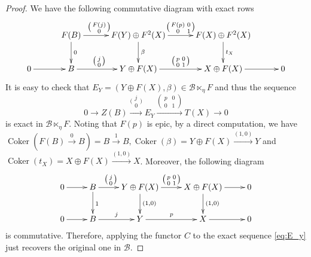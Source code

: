 \documentclass[11pt,reqno]{amsart}
\numberwithin{equation}{section}
\newcommand{\cB}{\mathcal B}
\newcommand{\Coker}{\operatorname{Coker}}
\begin{document}
\begin{proof}
We have the following commutative diagram with exact rows
\[
\xymatrix@C=2.5pc{ & F(B) \ar[r]^{\big(\begin{smallmatrix}F(j)\\ 0\end{smallmatrix}\big)\ \ \ \ } \ar[d]^{0} & F(Y)\oplus F^2(X)
\ar[r]^{\big(\begin{smallmatrix}F(p)&0\\ 0&1\end{smallmatrix}\big)} \ar[d]^{\beta}
& F(X)\oplus F^2(X) \ar[d]^{t_{X}}  \\
0\ar[r] & B\ar[r]^{\big(\begin{smallmatrix}j\\ 0\end{smallmatrix}\big)\ \ \ \ } & Y\oplus F(X)
\ar[r]^{\big(\begin{smallmatrix}p&0\\ 0&1\end{smallmatrix}\big)}& X\oplus F(X)\ar[r]&0}
\]
It is easy to check that $E_Y=(Y\oplus F(X), \beta)\in \cB\ltimes_\eta F$ and thus the sequence
\begin{equation}\label{eq:E_y}
0\rightarrow Z(B)\xrightarrow{\big(\begin{smallmatrix}j\\ 0\end{smallmatrix}\big)} E_Y\xrightarrow{\left(\begin{smallmatrix}p & 0\\ 0 & 1\end{smallmatrix}\right)} T(X)\rightarrow 0
\end{equation}
is exact in $\cB\ltimes_\eta F$. Noting that $F(p)$ is epic, by a direct computation, we have $\Coker(F(B)\xrightarrow{0} B)=B\xrightarrow{1}B, \Coker(\beta)=Y\oplus F(X)\xrightarrow{(1,0)}Y$ and $\Coker(t_X)=X\oplus F(X)\xrightarrow{(1,0)} X$. Moreover, the following diagram
\[
\xymatrix{
0\ar[r] & B\ar[r]^{\big(\begin{smallmatrix}j\\ 0\end{smallmatrix}\big)\ \ \ \ }\ar[d]^{1} & Y\oplus F(X)
\ar[r]^{\big(\begin{smallmatrix}p&0\\ 0&1\end{smallmatrix}\big)}\ar[d]^{(1,0)} & X\oplus F(X)\ar[r] \ar[d]^{(1,0)} &0\\
0\ar[r] & B\ar[r]^{j} & Y\ar[r]^{p} & X\ar[r] & 0
}
\]
is commutative. Therefore, applying the functor $C$ to the exact sequence \eqref{eq:E_y} just recovers the original one in $\cB$.
\end{proof}
\end{document}
